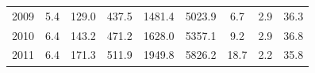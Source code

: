 \documentclass[openany]{book}
\begin{document}
\begin{table}[htbp]
{\begin{tabular}{ccccccccc}
\rowcolor[HTML]{F8F9FA} 
{\color[HTML]{202122} 2009}        & {\color[HTML]{202122} 5.4}                                                                  & {\color[HTML]{202122} 129.0}                                                                        & {\color[HTML]{202122} 437.5}                                                                    & {\color[HTML]{202122} 1481.4}                                                                              & {\color[HTML]{202122} 5023.9}                                                                          & {\color[HTML]{202122} 6.7}                                                                            & {\color[HTML]{202122} 2.9}                                                                               & {\color[HTML]{202122} 36.3}                                                                              \\
\rowcolor[HTML]{F8F9FA} 
{\color[HTML]{202122} 2010}        & {\color[HTML]{202122} 6.4}                                                                  & {\color[HTML]{202122} 143.2}                                                                        & {\color[HTML]{202122} 471.2}                                                                    & {\color[HTML]{202122} 1628.0}                                                                              & {\color[HTML]{202122} 5357.1}                                                                          & {\color[HTML]{202122} 9.2}                                                                            & {\color[HTML]{202122} 2.9}                                                                               & {\color[HTML]{202122} 36.8}                                                                              \\
\rowcolor[HTML]{F8F9FA} 
{\color[HTML]{202122} 2011}        & {\color[HTML]{202122} 6.4}                                                                  & {\color[HTML]{202122} 171.3}                                                                        & {\color[HTML]{202122} 511.9}                                                                    & {\color[HTML]{202122} 1949.8}                                                                              & {\color[HTML]{202122} 5826.2}                                                                          & {\color[HTML]{202122} 18.7}                                                                           & {\color[HTML]{202122} 2.2}                                                                               & {\color[HTML]{202122} 35.8}                                                                              \\

\end{tabular}}
\end{table}
\end{document}

